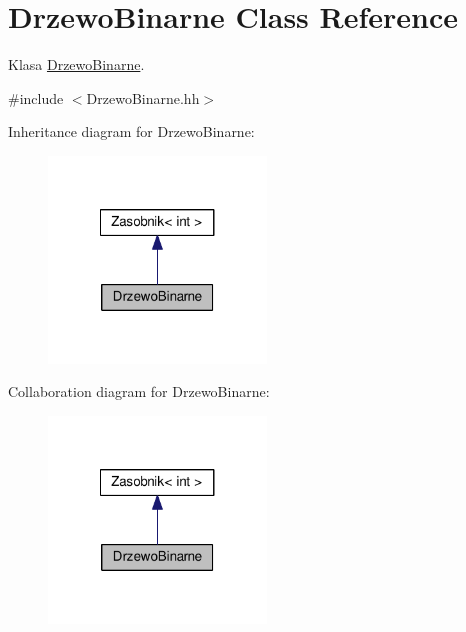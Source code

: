 \hypertarget{a00010}{}\section{Drzewo\+Binarne Class Reference}
\label{a00010}


Klasa \hyperlink{a00010}{Drzewo\+Binarne}.  




{\ttfamily \#include $<$Drzewo\+Binarne.\+hh$>$}



Inheritance diagram for Drzewo\+Binarne\+:
\nopagebreak
\begin{figure}[H]
\begin{center}
\leavevmode
\includegraphics[width=164pt]{a00142}
\end{center}
\end{figure}


Collaboration diagram for Drzewo\+Binarne\+:
\nopagebreak
\begin{figure}[H]
\begin{center}
\leavevmode
\includegraphics[width=164pt]{a00143}
\end{center}
\end{figure}
